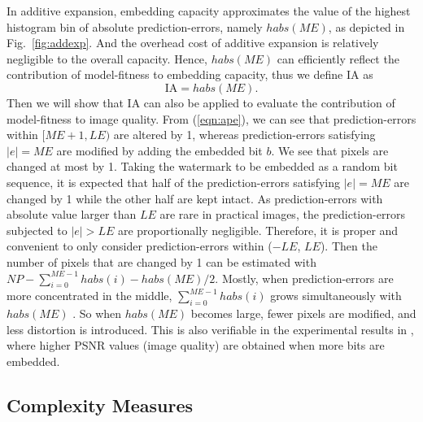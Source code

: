 \documentclass[journal]{IEEEtran}
\begin{document}
In additive expansion, embedding capacity approximates the value of the highest histogram bin of
absolute prediction-errors, namely $habs(\mathit{ME})$, as depicted in Fig.\ \ref{fig:addexp}. And
the overhead cost of additive expansion is relatively negligible to the overall capacity.  Hence,
$habs(\mathit{ME})$ can efficiently reflect the contribution of model-fitness to embedding capacity,
thus we define IA as
\begin{equation}\label{eqn:ia}
    \mbox{IA} = habs(\mathit{ME}).
\end{equation}
Then we will show that IA can also be applied to evaluate the contribution of model-fitness to image
quality. From (\ref{eqn:ape}), we can see that prediction-errors within $[\mathit{ME}+1,
\mathit{LE})$ are altered by 1, whereas prediction-errors satisfying $|e|=\mathit{ME}$ are modified
by adding the embedded bit $b$. We see that pixels are changed at most by 1. Taking the watermark to
be embedded as a random bit sequence, it is expected that half of the prediction-errors satisfying
$|e|=\mathit{ME}$ are changed by 1 while the other half are kept intact. As 
prediction-errors with absolute value larger than $\mathit{LE}$ are rare in practical images, the
prediction-errors subjected to $|e| > \mathit{LE}$ are proportionally negligible. Therefore, it is
proper and convenient to only consider prediction-errors within ($-\mathit{LE}$, $\mathit{LE}$). Then
the number of pixels that are changed by 1 can be estimated with $\mathit{NP} -
\sum_{i=0}^{\mathit{ME}-1} habs(i) - habs(\mathit{ME})/2$. Mostly, when prediction-errors are more
concentrated in the middle, $\sum_{i=0}^{\mathit{ME}-1} habs(i)$ grows simultaneously with
$habs(\mathit{ME})$ . So when $habs(\mathit{ME})$ becomes large, fewer pixels are modified, and less
distortion is introduced. This is also verifiable in the experimental results in
\cite{Chen09add,Chen09full}, where higher PSNR values (image quality) are obtained when more bits
are embedded. 

\subsection{Complexity Measures}
\end{document}
